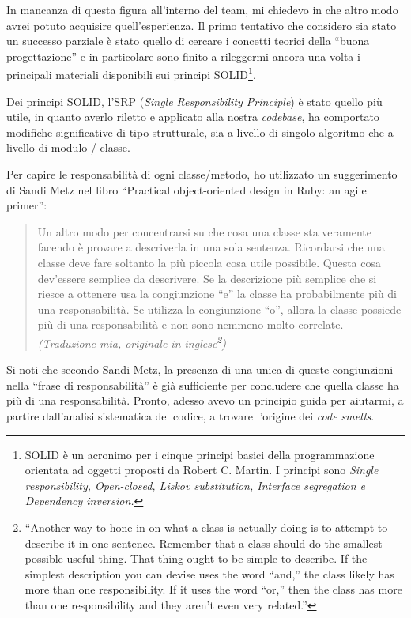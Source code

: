 \documentclass[12pt]{report}
\begin{document}
In mancanza di questa figura all'interno del team, mi chiedevo in che altro modo 
avrei potuto acquisire quell'esperienza. Il primo tentativo 
che considero sia stato un successo parziale è stato quello di 
cercare i concetti teorici della ``buona progettazione'' 
e in particolare sono finito a rileggermi ancora una volta 
i principali materiali disponibili sui principi SOLID\footnote{
SOLID è un acronimo per i cinque principi basici della programmazione
orientata ad oggetti proposti da Robert C. Martin. I principi sono \textit{
Single
responsibility, Open-closed, Liskov substitution, 
Interface segregation e Dependency inversion.
}
}. 

Dei principi SOLID, l'SRP (\textit{Single Responsibility Principle})
è stato quello più utile, in quanto averlo riletto e applicato alla 
nostra \textit{codebase}, ha comportato 
modifiche significative di tipo strutturale, sia a livello di singolo 
algoritmo che a livello di modulo / classe.

Per capire le responsabilità di ogni classe/metodo, ho utilizzato un
suggerimento di Sandi Metz nel libro ``Practical object-oriented 
design in Ruby: an agile primer'':

\begin{quote}
Un altro modo per concentrarsi su che cosa una classe sta veramente facendo
è provare a descriverla in una sola sentenza. Ricordarsi che una classe deve
fare soltanto la più piccola cosa utile possibile. Questa cosa dev'essere
semplice da descrivere. Se la descrizione più semplice che si riesce a
ottenere usa la congiunzione ``e'' la classe ha probabilmente più di una
responsabilità. Se utilizza la congiunzione ``o'', allora la classe
possiede più di una responsabilità e non sono nemmeno molto correlate. \cite{metz2013}
\flushright
\textit{(Traduzione mia, originale in inglese\footnote{
``Another way to hone in on what a class is actually doing is to attempt 
to describe it in one sentence. Remember that a class should do 
the smallest possible useful thing. That thing ought to be simple 
to describe. If the simplest description you can devise uses the word ``and,'' 
the class likely has more than one responsibility. If it uses the word ``or,'' 
then the class has more than one responsibility and they aren’t 
even very related.''})
}
\end{quote}

Si noti che secondo Sandi Metz, la presenza di
una unica di queste congiunzioni nella ``frase di responsabilità''
è già sufficiente per concludere che
quella classe ha più di una responsabilità. Pronto, adesso avevo un
principio guida per aiutarmi, a partire dall'analisi sistematica del codice,
a trovare l'origine dei \textit{code smells}.
\end{document}
